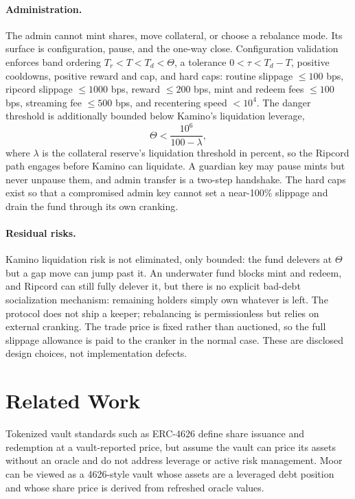 \documentclass[11pt]{article}
\theoremstyle{remark}
\newcommand{\BPS}{10^{4}}
\begin{document}
\paragraph{Administration.}
The admin cannot mint shares, move collateral, or choose a rebalance mode. Its surface is configuration, pause, and the one-way close. Configuration validation enforces band ordering $T_r < T < T_d < \Theta$, a tolerance $0 < \tau < T_d - T$, positive cooldowns, positive reward and cap, and hard caps: routine slippage $\le 100$ bps, ripcord slippage $\le 1000$ bps, reward $\le 200$ bps, mint and redeem fees $\le 100$ bps, streaming fee $\le 500$ bps, and recentering speed $< \BPS$. The danger threshold is additionally bounded below Kamino's liquidation leverage,
\begin{equation}
\Theta < \frac{10^{6}}{100 - \lambda},
\label{eq:danger-cap}
\end{equation}
where $\lambda$ is the collateral reserve's liquidation threshold in percent, so the Ripcord path engages before Kamino can liquidate. A guardian key may pause mints but never unpause them, and admin transfer is a two-step handshake. The hard caps exist so that a compromised admin key cannot set a near-100\% slippage and drain the fund through its own cranking.

\paragraph{Residual risks.}
Kamino liquidation risk is not eliminated, only bounded: the fund delevers at $\Theta$ but a gap move can jump past it. An underwater fund blocks mint and redeem, and Ripcord can still fully delever it, but there is no explicit bad-debt socialization mechanism: remaining holders simply own whatever is left. The protocol does not ship a keeper; rebalancing is permissionless but relies on external cranking. The trade price is fixed rather than auctioned, so the full slippage allowance is paid to the cranker in the normal case. These are disclosed design choices, not implementation defects.

\section{Related Work}

Tokenized vault standards such as ERC-4626 define share issuance and redemption at a vault-reported price, but assume the vault can price its assets without an oracle and do not address leverage or active risk management. Moor can be viewed as a 4626-style vault whose assets are a leveraged debt position and whose share price is derived from refreshed oracle values.
\end{document}
